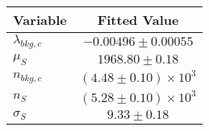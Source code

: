 \begin{tabular}[t]{lc}
\hline
Variable &Fitted Value\\
\hline\hline
$\lambda_{bkg,c}$&$-0.00496\pm0.00055$\\
\hline
$\mu_{S}$&$1968.80\pm0.18$\\
\hline
$n_{bkg,c}$&$(4.48\pm0.10)\times 10^3$\\
\hline
$n_{S}$&$(5.28\pm0.10)\times 10^3$\\
\hline
$\sigma_{S}$&$9.33\pm0.18$\\
\hline
\end{tabular}